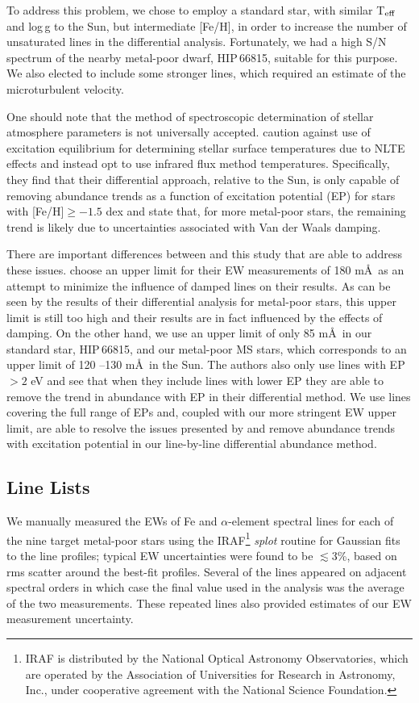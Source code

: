 \documentclass[revtex4]{emulateapj}
\begin{document}
To address this problem, we chose to employ a standard star, with similar T$_{\rm eff}$ and log\,g to the Sun, but intermediate [Fe/H], in order to increase the number of unsaturated lines in the differential analysis.  Fortunately, we had a high S/N spectrum of the nearby metal-poor dwarf, HIP\,66815, suitable for this purpose.  We also elected to include some stronger lines, which required an estimate of the microturbulent velocity.

One should note that the method of spectroscopic determination of stellar atmosphere parameters is not universally accepted.  \citet{Sitnova2015} caution against use of excitation equilibrium for determining stellar surface temperatures due to NLTE effects and instead opt to use infrared flux method temperatures.  Specifically, they find that their differential approach, relative to the Sun, is only capable of removing abundance trends as a function of excitation potential (EP) for stars with [Fe/H]$\geq-1.5$ dex and state that, for more metal-poor stars, the remaining trend is likely due to uncertainties associated with Van der Waals damping.

There are important differences between \citet{Sitnova2015} and this study that are able to address these issues.  \citet{Sitnova2015} choose an upper limit for their EW measurements of 180 m\AA\ as an attempt to minimize the influence of damped lines on their results.  As can be seen by the results of their differential analysis for metal-poor stars, this upper limit is still too high and their results are in fact influenced by the effects of damping.  On the other hand, we use an upper limit of only 85 m\AA\ in our standard star, HIP\,66815, and our metal-poor MS stars, which corresponds to an upper limit of 120 --130 m\AA\ in the Sun.  The authors also only use lines with EP$>2$ eV and see that when they include lines with lower EP they are able to remove the trend in abundance with EP in their differential method.  We use lines covering the full range of EPs and, coupled with our more stringent EW upper limit, are able to resolve the issues presented by \citet{Sitnova2015} and remove abundance trends with excitation potential in our line-by-line differential abundance method.

\subsection{Line Lists}
We manually measured the EWs of Fe and $\alpha$-element spectral lines for each  of the nine target metal-poor stars using the IRAF\footnote{IRAF is distributed by the National Optical Astronomy Observatories, which are operated by the  Association of Universities for Research in Astronomy, Inc., under cooperative  agreement with the National Science Foundation.} \emph{splot} routine for Gaussian fits to the line profiles; typical EW uncertainties were found to be $\lesssim$3\%, based on rms scatter around the best-fit profiles.  Several of the lines appeared on adjacent spectral orders in which case the final value used in the analysis was the average of the two measurements.   These repeated lines also provided estimates of our EW measurement uncertainty.
\end{document}
